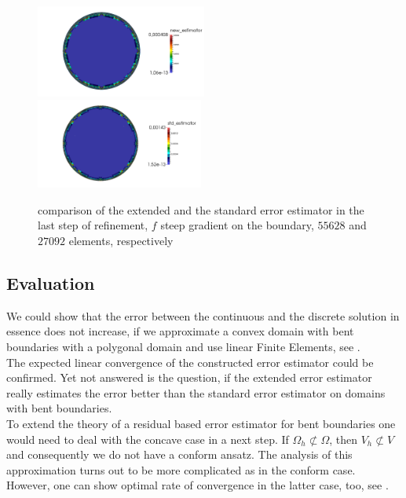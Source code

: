\documentclass[a4paper, 11pt, twoside]{article}
\begin{document}
\begin{figure}[htbp!]
   \includegraphics[width=0.50\textwidth]{fig/circle_est/circle_parabel_12.png}
   \hfill
  \includegraphics[width=0.49\textwidth]{fig/circle_std/circle_parabel_12.png}
     \caption{comparison of the extended and the standard error estimator in the last step of refinement, $f$ steep gradient on the boundary, $55628$ and $27092$ elements, respectively}
\end{figure}

\newpage
\subsection{Evaluation}
We could show that the error between the continuous and the discrete solution in essence does not increase, if we approximate a convex domain with bent boundaries with a polygonal domain and use 
linear Finite Elements, see \cite[page 139]{dziuk}.\\
The expected linear convergence of the constructed error estimator could be confirmed.
Yet not answered is the question, if the extended error estimator really estimates the error better than the standard error estimator on domains with bent boundaries.\\

To extend the theory of a residual based error estimator for bent boundaries one would need to deal with the concave case in a next step.
If $\Omega_h \not \subset \Omega$, then $V_h \not \subset V$ and consequently we do not have a conform ansatz.
The analysis of this approximation turns out to be more complicated as in the conform case.
However, one can show optimal rate of convergence in the latter case, too, see \cite[page 89]{rannacher}.
\end{document}
